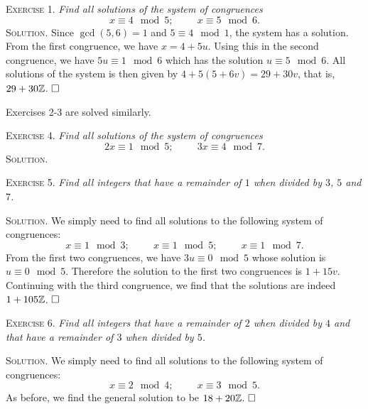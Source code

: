 \documentclass[11pt, leqno]{article}
\newcommand{\done}{\ensuremath{\hfill\square}}
\begin{document}
\textsc{Exercise 1}. \emph{Find all solutions of the system of congruences 
\begin{displaymath}
x \equiv 4 \mod 5; \hspace{1cm} x\equiv 5 \mod 6.
\end{displaymath}}\textsc{Solution}. Since $\gcd(5,6)=1$ and $5 \equiv 4 \mod 1$, the system has a solution. From the first congruence, we have $x=4+5u$. Using this in the second congruence, we have $5u\equiv 1 \mod 6$ which has the solution $u \equiv 5 \mod 6$. All solutions of the system is then given by $4+5(5+6v) = 29 + 30v$, that is, $29+30\mathbb{Z}$. \done

Exercises 2-3 are solved similarly.

\textsc{Exercise 4}. \emph{Find all solutions of the system of congruences 
\begin{displaymath}
2x \equiv 1 \mod 5; \hspace{1cm} 3x\equiv 4 \mod 7. 
\end{displaymath}}\textsc{Solution}.

\textsc{Exercise 5}. \emph{Find all integers that have a remainder of $1$ when divided by $3$, $5$ and $7$.}

\textsc{Solution}. We simply need to find all solutions to the following system of congruences: 
\begin{displaymath}
x\equiv 1 \mod 3; \hspace{1cm} x\equiv 1 \mod 5; \hspace{1cm} x \equiv 1 \mod 7.
\end{displaymath}
From the first two congruences, we have $3u \equiv 0\mod 5$ whose solution is $u\equiv 0 \mod 5$. Therefore the solution to the first two congruences is $1+15v$. Continuing with the third congruence, we find that the solutions are indeed $1+105\mathbb{Z}$. \done

\textsc{Exercise 6}. \emph{Find all integers that have a remainder of $2$ when divided by $4$ and that have a remainder of $3$ when divided by $5$.}

\textsc{Solution}. We simply need to find all solutions to the following system of congruences: 
\begin{displaymath}
x\equiv 2 \mod 4; \hspace{1cm} x\equiv 3 \mod 5.
\end{displaymath}
As before, we find the general solution to be $18+20\mathbb{Z}$. \done
\end{document}

